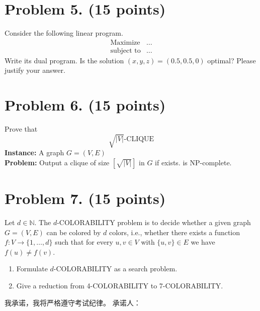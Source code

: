 \documentclass[11pt, a4paper]{article}
\begin{document}
\section*{Problem 5. (15 points)}
Consider the following linear program.
\[
\begin{array}{ll}
\text{Maximize} & \ldots \\
\text{subject to} & \ldots
\end{array}
\]
Write its dual program. Is the solution \((x,y,z) = (0.5,0.5,0)\) optimal? Please justify your answer.

\section*{Problem 6. (15 points)}
Prove that
\[ \sqrt{|V|} \text{-CLIQUE} \]
\textbf{Instance:} A graph \(G = (V, E)\) \\
\textbf{Problem:} Output a clique of size \(\left[ \sqrt{|V|} \right]\) in \(G\) if exists.
is NP-complete.

\section*{Problem 7. (15 points)}
Let \(d \in \mathbb{N}\). The \(d\)-COLORABILITY problem is to decide whether a given graph \(G = (V, E)\) can be colored by \(d\) colors, i.e., whether there exists a function \(f: V \to \{1, \ldots, d\}\) such that for every \(u, v \in V\) with \(\{u, v\} \in E\) we have \(f(u) \neq f(v)\).

\begin{enumerate}[label=(\arabic*), leftmargin=*]
    \item Formulate \(d\)-COLORABILITY as a search problem.
    \item Give a reduction from 4-COLORABILITY to 7-COLORABILITY.
\end{enumerate}

\vspace{2cm}
\noindent
我承诺，我将严格遵守考试纪律。 \hfill 承诺人：\underline{\hspace{4cm}}
\end{document}
